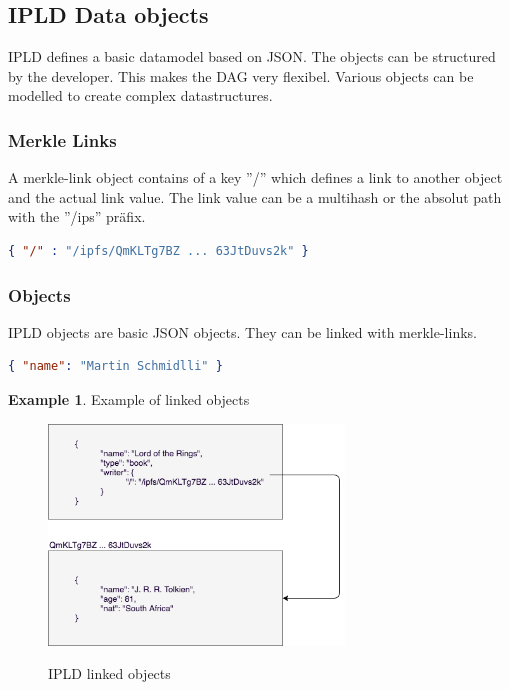 \documentclass[a4paper,11pt, oneside]{report}
\theoremstyle{definition}
\newtheorem{exmp}{Example}[subsection]
\begin{document}
\newpage

\subsection{IPLD Data objects}
IPLD defines a basic datamodel based on JSON. The objects can be structured by the developer. This makes the DAG very flexibel. Various objects can be modelled to create complex datastructures.

\subsubsection{Merkle Links}
A merkle-link object contains of a key ''/'' which defines a link to another object and the actual link value. The link value can be a multihash or the absolut path with the ''/ips'' präfix. 
\begin{lstlisting}[language=json]
{ "/" : "/ipfs/QmKLTg7BZ ... 63JtDuvs2k" }
\end{lstlisting}

\subsubsection{Objects}
IPLD objects are basic JSON objects. They can be linked with merkle-links.
\begin{lstlisting}[language=json]
{ "name": "Martin Schmidlli" }
\end{lstlisting}

\begin{exmp} Example of linked objects
\begin{figure}[H]
\centering
\includegraphics[width=0.7\textwidth]{img/ipld-example.png}\\[0.8cm]
\caption[IPLD linked objects]{IPLD linked objects}
\end{figure}
\end{exmp}
\end{document}
